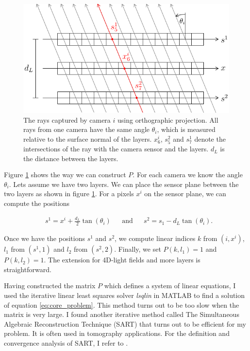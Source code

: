 \documentclass[11pt,a4paper,titlepage]{article}
\begin{document}
\begin{figure}[h]
	\centering
	\includegraphics[scale=1]{sketches/projection_type_orthographic.pdf} 
	\caption{The rays captured by camera $i$ using orthographic projection. All rays from one camera have the same angle $\theta_i$, which is measured relative to the surface normal of the layers. $x_6^i$, $s_5^2$ and $s_7^1$ denote the intersections of the ray with the camera sensor and the layers. $d_L$ is the distance between the layers.}
	\label{fig:orthographic_cameras_layers_sketch}
\end{figure}

Figure \ref{fig:orthographic_cameras_layers_sketch} shows the way we can construct $P$. For each camera we know the angle $\theta_i$. Lets assume we have two layers. We can place the sensor plane between the two layers as shown in figure \ref{fig:orthographic_cameras_layers_sketch}. For a pixels $x^i$ on the sensor plane, we can compute the positions

\begin{align*}
	& s^1 = x^i + \frac{d_L}{2}\tan\left( \theta_i \right) && \text{and} && s^2 = s_1 - d_L \tan\left( \theta_i \right) \text{.}
\end{align*}

Once we have the positions $s^1$ and $s^2$, we compute linear indices $k$ from $\left(i, x^i\right)$, $l_1$ from $\left(s^1, 1\right)$ and $l_2$ from $\left(s^2, 2\right)$. Finally, we set $P\left(k, l_1\right) = 1$ and $P\left(k, l_2\right) = 1$. The extension for 4D-light fields and more layers is straightforward.

Having constructed the matrix $P$ which defines a system of linear equations, I used the iterative  linear least squares solver \emph{lsqlin} in MATLAB to find a solution of equation \ref{eq:core_problem}. This method turns out to be too slow when the matrix is very large. I found another iterative method called The Simultaneous Algebraic Reconstruction Technique (SART) that turns out to be efficient for my problem. It is often used in tomography applications. For the definition and convergence analysis of SART, I refer to \cite{CONV_SART}. 
\end{document}
